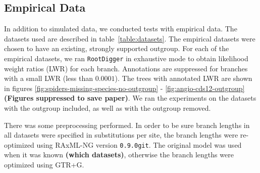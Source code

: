 \documentclass{article}
\newcommand{\RootDiggertt}{\texttt{RootDigger}}
\newcommand{\BenComment}[1]{{\bf \color{blue} ({#1})}}
\begin{document}
%
%
%

\subsection{Empirical Data}

In addition to simulated data, we conducted tests with empirical data. The
datasets used are described in table~\ref{table:datasets}.  The empirical
datasets were chosen to have an existing, strongly supported outgroup.  For each
of the empirical datasets, we ran \RootDiggertt{} in exhaustive mode to obtain
likelihood weight ratios (LWR) for each branch.  Annotations are suppressed for
branches with a small LWR (less than $0.0001$).  The trees with annotated LWR
are shown in figures \ref{fig:spiders-missing-species-no-outgroup} -
\ref{fig:angio-cds12-outgroup} \BenComment{Figures suppressed to save paper}.
We ran the experiments on the datasets with the outgroup included, as well as
with the outgroup removed.

There was some preprocessing performed. In order to be sure branch lengths in
all datasets were specified in substitutions per site, the branch lengths were
re-optimized using RAxML-NG \cite{kozlov_raxml-ng:_2019} version
\texttt{0.9.0git}. The original model was used when it was
known\BenComment{which datasets}, otherwise the
branch lengths were optimized using GTR+G.
\end{document}
